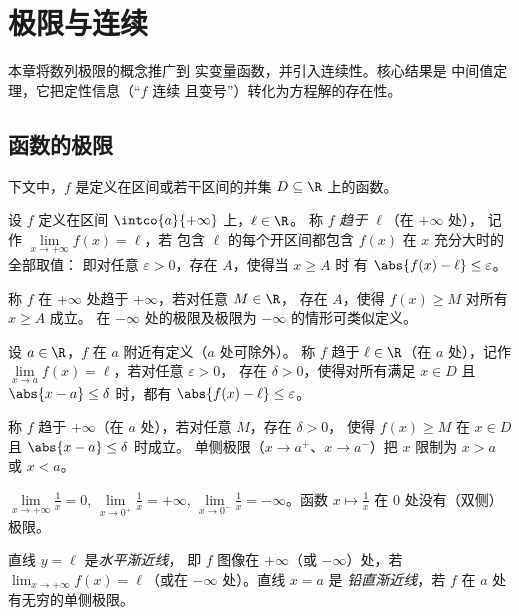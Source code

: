 \chapter{极限与连续}\label{ch:g12:limcont}

本章将数列极限的概念推广到
实变量函数，并引入连续性。核心结果是
中间值定理，它把定性信息（“$f$ 连续
且变号”）转化为方程解的存在性。

\section{函数的极限}

下文中，$f$ 是定义在区间或若干区间的并集
$D \subseteq \R$ 上的函数。

\begin{definition}[无穷远处的极限]\label{def:g12:limcont:liminf}
设 $f$ 定义在区间 $\intco{a}{+\infty}$ 上，$\ell \in \R$。
称 $f$ \emph{趋于 $\ell$}（在 $+\infty$ 处），
记作 $\lim\limits_{x\to+\infty} f(x) = \ell$，若
包含 $\ell$ 的每个开区间都包含 $f(x)$ 在 $x$ 充分大时的全部取值：
即对任意 $\varepsilon > 0$，存在 $A$，使得当 $x \geq A$ 时
有 $\abs{f(x) - \ell} \leq \varepsilon$。

称 $f$ 在 $+\infty$ 处趋于 $+\infty$，若对任意 $M \in \R$，
存在 $A$，使得 $f(x) \geq M$ 对所有 $x \geq A$ 成立。
在 $-\infty$ 处的极限及极限为 $-\infty$ 的情形可类似定义。
\end{definition}

\begin{definition}[一点处的极限]\label{def:g12:limcont:limpoint}
设 $a \in \R$，$f$ 在 $a$ 附近有定义（$a$ 处可除外）。
称 $f$ 趋于 $\ell \in \R$（在 $a$ 处），记作
$\lim\limits_{x \to a} f(x) = \ell$，若对任意 $\varepsilon > 0$，
存在 $\delta > 0$，使得对所有满足 $x \in D$ 且
$\abs{x - a} \leq \delta$ 时，都有 $\abs{f(x) - \ell} \leq \varepsilon$。

称 $f$ 趋于 $+\infty$（在 $a$ 处），若对任意 $M$，存在 $\delta > 0$，
使得 $f(x) \geq M$ 在 $x \in D$ 且 $\abs{x - a} \leq \delta$ 时成立。
单侧极限（$x \to a^+$、$x \to a^-$）把 $x$ 限制为 $x > a$
或 $x < a$。
\end{definition}

\begin{example}
$\lim\limits_{x\to+\infty} \frac{1}{x} = 0$,
$\lim\limits_{x\to 0^+} \frac{1}{x} = +\infty$,
$\lim\limits_{x\to 0^-} \frac{1}{x} = -\infty$。函数
$x \mapsto \frac1x$ 在 $0$ 处没有（双侧）极限。
\end{example}

\begin{definition}[渐近线]\label{def:g12:limcont:asymptote}
直线 $y = \ell$ 是\emph{水平渐近线}，
即 $f$ 图像在 $+\infty$（或 $-\infty$）处，若
$\lim_{x\to+\infty} f(x) = \ell$（或在 $-\infty$ 处）。直线 $x = a$ 是
\emph{铅直渐近线}，若 $f$ 在 $a$ 处有无穷的单侧极限。
\end{definition}

